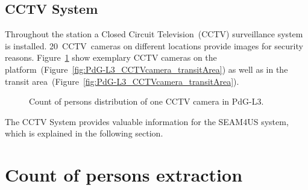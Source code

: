 \subsection{CCTV System}
\label{subsec:CCTVSystem}

Throughout the station a Closed Circuit Television~(CCTV) surveillance system is installed. 20~CCTV~cameras on different locations provide images for security reasons. Figure~\ref{fig:PdG-L3_CCTVcameras} show exemplary CCTV cameras on the platform~(Figure~\ref{fig:PdG-L3_CCTVcamera_transitArea}) as well as in the transit area~(Figure~\ref{fig:PdG-L3_CCTVcamera_transitArea}).

\begin{figure}%

  \centering

  \hfill

  \caption{Count of persons distribution of one CCTV camera in PdG-L3.}
  \label{fig:PdG-L3_CCTVcameras}

\end{figure}

The CCTV System provides valuable information for the SEAM4US system, which is explained in the following section.


\section{Count of persons extraction}
\label{sec:PassengerDensityDataExtraction}

